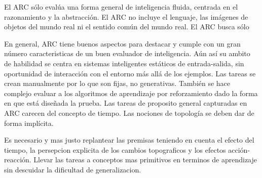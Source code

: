 El ARC sólo evalúa una forma general de inteligencia fluida, centrada en el razonamiento y la abstracción. El ARC no incluye el lenguaje, las imágenes de objetos del mundo real ni el sentido común del mundo real. El ARC busca sólo

En general, ARC tiene buenos aspectos para destacar y cumple con un gran número caracteristicas de un buen evaluador de inteligencia. Aún así su ambito de habilidad se centra en sistemas inteligentes estáticos de entrada-salida, sin oportunidad de interacción con el entorno más allá de los ejemplos. Las tareas se crean manualmente por lo que son fijas, no generativas. También se hace complejo evaluar a los algoritmos de aprendizaje por reforzamiento dado la forma en que está diseñada la prueba. Las tareas de proposito general capturadas en ARC carecen del concepto de tiempo. Las nociones de topología se deben dar de forma implícita. 

Es necesario y mas justo replantear las premisas teniendo en cuenta el efecto del tiempo, la persepcion explicita de los cambios topograficos y los efectos acción-reacción. Llevar las tareas a conceptos mas primitivos en terminos de aprendizaje sin descuidar la dificultad de generalizacion.